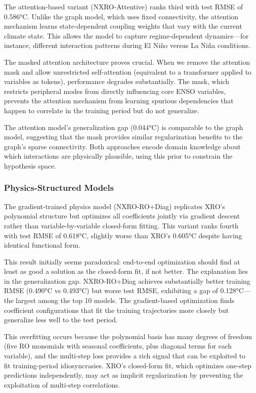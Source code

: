 The attention-based variant (NXRO-Attentive) ranks third with test RMSE of 0.586°C. Unlike the graph model, which uses fixed connectivity, the attention mechanism learns state-dependent coupling weights that vary with the current climate state. This allows the model to capture regime-dependent dynamics---for instance, different interaction patterns during El Ni\~no versus La Ni\~na conditions.

The masked attention architecture proves crucial. When we remove the attention mask and allow unrestricted self-attention (equivalent to a transformer applied to variables as tokens), performance degrades substantially. The mask, which restricts peripheral modes from directly influencing core ENSO variables, prevents the attention mechanism from learning spurious dependencies that happen to correlate in the training period but do not generalize.

The attention model's generalization gap (0.044°C) is comparable to the graph model, suggesting that the mask provides similar regularization benefits to the graph's sparse connectivity. Both approaches encode domain knowledge about which interactions are physically plausible, using this prior to constrain the hypothesis space.

\subsubsection{Physics-Structured Models}

The gradient-trained physics model (NXRO-RO+Diag) replicates XRO's polynomial structure but optimizes all coefficients jointly via gradient descent rather than variable-by-variable closed-form fitting. This variant ranks fourth with test RMSE of 0.618°C, slightly worse than XRO's 0.605°C despite having identical functional form.

This result initially seems paradoxical: end-to-end optimization should find at least as good a solution as the closed-form fit, if not better. The explanation lies in the generalization gap. NXRO-RO+Diag achieves substantially better training RMSE (0.490°C vs 0.493°C) but worse test RMSE, exhibiting a gap of 0.128°C---the largest among the top 10 models. The gradient-based optimization finds coefficient configurations that fit the training trajectories more closely but generalize less well to the test period.

This overfitting occurs because the polynomial basis has many degrees of freedom (five RO monomials with seasonal coefficients, plus diagonal terms for each variable), and the multi-step loss provides a rich signal that can be exploited to fit training-period idiosyncrasies. XRO's closed-form fit, which optimizes one-step predictions independently, may act as implicit regularization by preventing the exploitation of multi-step correlations.

